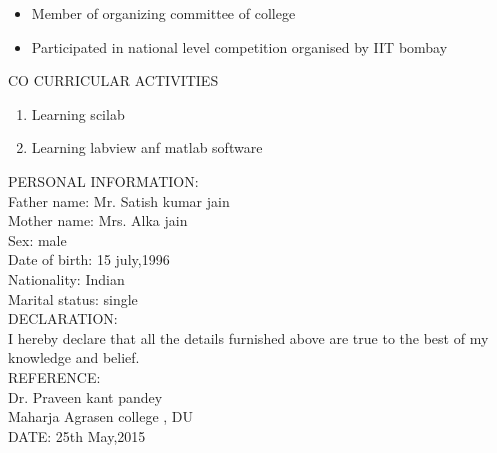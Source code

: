 \documentclass[11pt,a4paper]{article}
\begin{document}
\begin{flushleft}
	          \begin{itemize}
	          	\item Member of organizing committee of college\\
	          	\item Participated in national level competition organised by IIT bombay\\
	          	
	          \end{itemize}
	          \textsf{CO CURRICULAR ACTIVITIES}
	          \begin{enumerate}
	          	\item Learning scilab\\
	          	\item Learning labview anf matlab software	
	          \end{enumerate}
	          \textsf{PERSONAL INFORMATION:}\\ 
	          \medskip
	          Father name: Mr. Satish kumar jain\\
	          Mother name: Mrs. Alka jain\\
	          Sex: male\\
	          Date of birth: 15 july,1996\\
	          Nationality: Indian\\
	          Marital status: single\\
	          \medskip
	          \textsf{ DECLARATION: }\\
	          I hereby declare that all the details furnished above are true to the best of my knowledge and belief.\\
	          \medskip
	           \textsf{ REFERENCE: }\\
	           
	           
	           Dr. Praveen kant pandey\\
	           Maharja Agrasen college , DU\\
	           \medskip
	           \textsf{ DATE: }25th May,2015
\end{flushleft}

 
\end{document}
